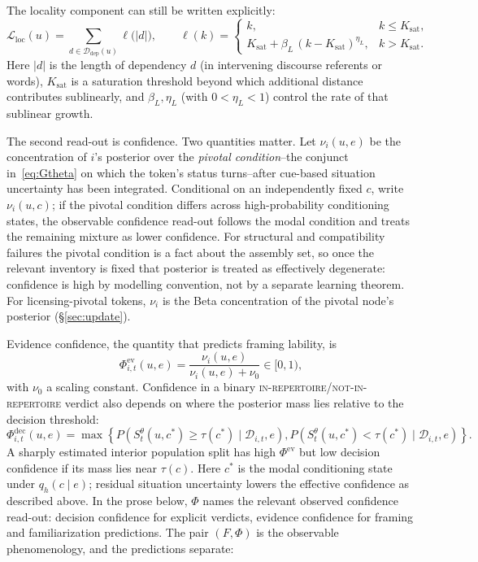 The locality component can still be written explicitly:
\begin{equation*}
\mathcal{L}_{\mathrm{loc}}(u)=
\sum_{d\in\mathcal{D}_{\mathrm{dep}}(u)}\ell\!\bigl(|d|\bigr),\qquad
\ell(k)=
  \begin{cases}
    k, & k\le K_{\text{sat}},\\[4pt]
    K_{\text{sat}}+\beta_L\,(k-K_{\text{sat}})^{\eta_L}, & k>K_{\text{sat}}.
  \end{cases}
\end{equation*}
Here $|d|$ is the length of dependency $d$ (in intervening discourse referents or
words), $K_{\text{sat}}$ is a saturation threshold beyond which additional
distance contributes sublinearly, and $\beta_L,\eta_L$ (with $0<\eta_L<1$)
control the rate of that sublinear growth.

The second read-out is confidence. Two quantities matter. Let $\nu_i(u,e)$ be
the concentration of $i$'s posterior over the \emph{pivotal condition}--the
conjunct in~\eqref{eq:Gtheta} on which the token's status turns--after cue-based
situation uncertainty has been integrated. Conditional on an independently fixed
$c$, write $\nu_i(u,c)$; if the pivotal condition differs across
high-probability conditioning states, the observable confidence read-out follows
the modal condition and treats the remaining mixture as lower confidence. For
structural and compatibility failures the pivotal condition is a fact about the
assembly set, so once the relevant inventory is fixed that posterior is treated
as effectively degenerate: confidence is high by modelling convention, not by a
separate learning theorem. For licensing-pivotal tokens, $\nu_i$ is the Beta
concentration of the pivotal node's posterior (\S\ref{sec:update}).

Evidence confidence, the quantity that predicts framing lability, is
\begin{equation}
\Phi^{\mathrm{ev}}_{i,t}(u,e)=\frac{\nu_i(u,e)}{\nu_i(u,e)+\nu_0}
\in [0,1),
\end{equation}
\noindent with $\nu_0$ a scaling constant. Confidence in a binary
\textsc{in-repertoire}/\textsc{not-in-repertoire} verdict also depends on where
the posterior mass lies relative to the decision threshold:
\begin{equation}
\Phi^{\mathrm{dec}}_{i,t}(u,e)=
\max\!\left\{
P\!\left(S_t^{\theta}(u,c^\ast)\ge\tau(c^\ast)\mid\mathcal{D}_{i,t},e\right),
P\!\left(S_t^{\theta}(u,c^\ast)<\tau(c^\ast)\mid\mathcal{D}_{i,t},e\right)
\right\}.
\label{eq:phi-dec}
\end{equation}
A sharply estimated interior population split has high
$\Phi^{\mathrm{ev}}$ but low decision confidence if its mass lies near
$\tau(c)$. Here $c^\ast$ is the modal conditioning state under $q_h(c\mid e)$;
residual situation uncertainty lowers the effective confidence as described
above. In the prose below, $\Phi$ names the relevant observed confidence
read-out: decision confidence for explicit verdicts, evidence confidence for
framing and familiarization predictions. The pair $(F,\Phi)$ is the observable
phenomenology, and the predictions separate:


